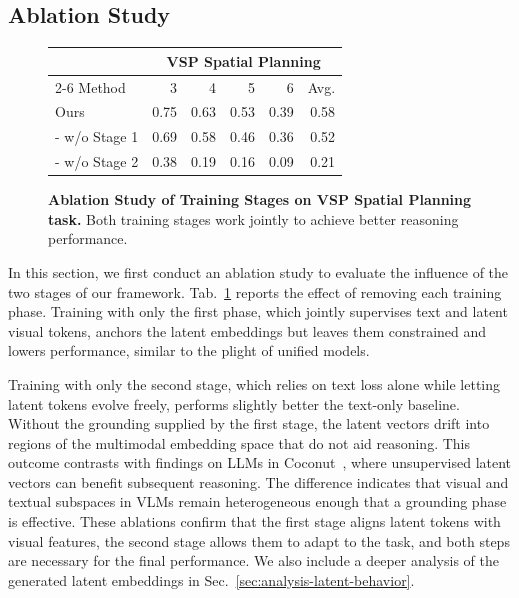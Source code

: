 \subsection{Ablation Study}
\label{sec:exp-ablation-study}

\begin{figure}
    \centering
    \caption{\textbf{Ablation Study of Training Stages on VSP Spatial Planning task.} Both training stages work jointly to achieve better reasoning performance.}
    \begin{tabular}{lrrrrr}
        \toprule
        & \multicolumn{5}{c}{\textbf{VSP Spatial Planning}} \\
        \cmidrule(lr){2-6}
        Method & 3 & 4 & 5 & 6 & Avg. \\
        \midrule
        Ours & 0.75 & 0.63 & 0.53 & 0.39 & 0.58\\
        - w/o Stage 1 & 0.69 & 0.58 & 0.46 & 0.36 & 0.52 \\
        - w/o Stage 2 & 0.38 & 0.19 & 0.16 & 0.09 & 0.21 \\
        \bottomrule
    \end{tabular}
    \label{tab:main-ablation-training-stage}
\end{figure}

In this section, we first conduct an ablation study to evaluate the influence of the two stages of our framework. 
Tab.~\ref{tab:main-ablation-training-stage} reports the effect of removing each training phase. Training with only the first phase, which jointly supervises text and latent visual tokens, anchors the latent embeddings but leaves them constrained and lowers performance, similar to the plight of unified models.

Training with only the second stage, which relies on text loss alone while letting latent tokens evolve freely, performs slightly better the text-only baseline. Without the grounding supplied by the first stage, the latent vectors drift into regions of the multimodal embedding space that do not aid reasoning.
This outcome contrasts with findings on LLMs in Coconut~\citep{hao2024training}, where unsupervised latent vectors can benefit subsequent reasoning. The difference indicates that visual and textual subspaces in VLMs remain heterogeneous enough that a grounding phase is effective. These ablations confirm that the first stage aligns latent tokens with visual features, the second stage allows them to adapt to the task, and both steps are necessary for the final performance. We also include a deeper analysis of the generated latent embeddings in Sec.~\ref{sec:analysis-latent-behavior}.


